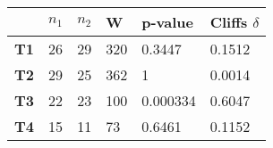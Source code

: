 \begin{tabular}{llllll}
\hline
            & \textbf{$n_1$} & \textbf{$n_2$} & \textbf{W} & \textbf{p-value} & \textbf{Cliffs $\delta$} \\ \hline
\textbf{T1} & 26                      & 29                       & 320        & 0.3447           & 0.1512     \\
\textbf{T2} & 29                      & 25                       & 362        & 1                & 0.0014     \\
\textbf{T3} & 22                      & 23                       & 100        & 0.000334         & 0.6047     \\
\textbf{T4} & 15                      & 11                       & 73         & 0.6461           & 0.1152     \\ \hline
\end{tabular}
